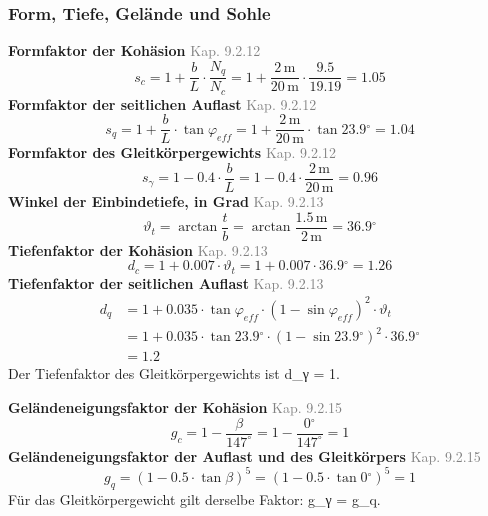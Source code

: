 \documentclass[11pt,a4paper]{article}
\newcommand{\normref}[1]{{\small\textcolor{gray}{#1}}}
\begin{document}
\subsubsection{Form, Tiefe, Gelände und Sohle}
\noindent\textbf{Formfaktor der Kohäsion} \hfill \normref{Kap. 9.2.12}
\begin{equation*}
s_c = 1 + \frac{b}{L} \cdot \frac{N_q}{N_c} = 1 + \frac{2\,\mathrm{m}}{20\,\mathrm{m}} \cdot \frac{9.5}{19.19} = 1.05
\end{equation*}
\noindent\textbf{Formfaktor der seitlichen Auflast} \hfill \normref{Kap. 9.2.12}
\begin{equation*}
s_q = 1 + \frac{b}{L} \cdot \tan \varphi_{eff} = 1 + \frac{2\,\mathrm{m}}{20\,\mathrm{m}} \cdot \tan 23.9{}^{\circ} = 1.04
\end{equation*}
\noindent\textbf{Formfaktor des Gleitkörpergewichts} \hfill \normref{Kap. 9.2.12}
\begin{equation*}
s_{\gamma} = 1 - 0.4 \cdot \frac{b}{L} = 1 - 0.4 \cdot \frac{2\,\mathrm{m}}{20\,\mathrm{m}} = 0.96
\end{equation*}
\noindent\textbf{Winkel der Einbindetiefe, in Grad} \hfill \normref{Kap. 9.2.13}
\begin{equation*}
\vartheta_t = \arctan\frac{t}{b} = \arctan\frac{1.5\,\mathrm{m}}{2\,\mathrm{m}} = 36.9{}^{\circ}
\end{equation*}
\noindent\textbf{Tiefenfaktor der Kohäsion} \hfill \normref{Kap. 9.2.13}
\begin{equation*}
d_c = 1 + 0.007 \cdot \vartheta_t = 1 + 0.007 \cdot 36.9{}^{\circ} = 1.26
\end{equation*}
\noindent\textbf{Tiefenfaktor der seitlichen Auflast} \hfill \normref{Kap. 9.2.13}
\begin{equation*}
\begin{aligned}
  d_q &= 1 + 0.035 \cdot \tan \varphi_{eff} \cdot \left(1 - \sin \varphi_{eff}\right)^{2} \cdot \vartheta_t \\
  &= 1 + 0.035 \cdot \tan 23.9{}^{\circ} \cdot \left(1 - \sin 23.9{}^{\circ}\right)^{2} \cdot 36.9{}^{\circ} \\
  &= 1.2
\end{aligned}
\end{equation*}
Der Tiefenfaktor des Gleitkörpergewichts ist d\_γ = 1.

\noindent\textbf{Geländeneigungsfaktor der Kohäsion} \hfill \normref{Kap. 9.2.15}
\begin{equation*}
g_c = 1 - \frac{\beta}{147^\circ} = 1 - \frac{0{}^{\circ}}{147^\circ} = 1
\end{equation*}
\noindent\textbf{Geländeneigungsfaktor der Auflast und des Gleitkörpers} \hfill \normref{Kap. 9.2.15}
\begin{equation*}
g_q = \left(1 - 0.5 \cdot \tan \beta\right)^{5} = \left(1 - 0.5 \cdot \tan 0{}^{\circ}\right)^{5} = 1
\end{equation*}
Für das Gleitkörpergewicht gilt derselbe Faktor: g\_γ = g\_q.
\end{document}
